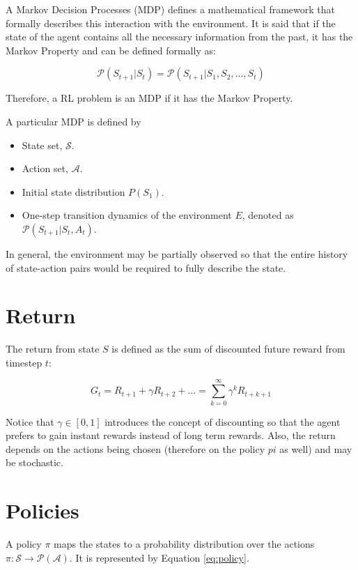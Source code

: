 A Markov Decision Processes (MDP) defines a mathematical framework that formally describes this interaction with the environment.
It is said that if the state of the agent contains all the necessary information from the past, it has the Markov Property and can be defined formally as:

\begin{equation}
    \mathcal{P}(S_{t + 1} | S_t) = \mathcal{P}(S_{t + 1} | S_1, S_2, ..., S_t)
\end{equation}

Therefore, a RL problem is an MDP if it has the Markov Property.

A particular MDP is defined by

\begin{itemize}
    \item State set, $\mathcal{S}$.
    \item Action set, $\mathcal{A}$.
    \item Initial state distribution $P(S_1)$.
    \item One-step transition dynamics of the environment $E$, denoted as $\mathcal{P}(S_{t+1} | S_t, A_t)$.
\end{itemize}

In general, the environment may be partially observed so that the entire history of state-action pairs
would be required to fully describe the state. 

\section{Return}

The return from state $S$ is defined as the sum of discounted future reward from timestep $t$:

\begin{equation}
    G_t = R_{t +1} + \gamma R_{t + 2} + ... = \sum_{k = 0}^{\infty}\gamma^k R_{t + k + 1}
\end{equation}

Notice that $\gamma \in [0,1]$ introduces the concept of discounting so that the agent prefers to gain instant rewards instead of long term rewards.
Also, the return depends on the actions being chosen (therefore on the policy $pi$ as well) and may be stochastic.

\section{Policies}

A policy $\pi$ maps the states to a probability distribution over the actions $\pi: \mathcal{S} \rightarrow \mathcal{P}(\mathcal{A})$.
It is represented by Equation \eqref{eq:policy}.

